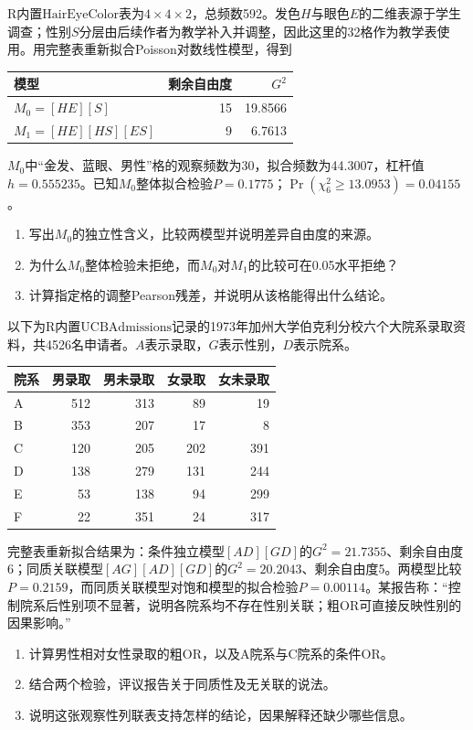 R内置$\mathrm{HairEyeColor}$表为$4\times4\times2$，总频数592。发色$H$与眼色$E$的二维表源于学生调查；性别$S$分层由后续作者为教学补入并调整，因此这里的32格作为教学表使用。用完整表重新拟合Poisson对数线性模型，得到\begin{center}\small\begin{tabular}{@{}lrr@{}}\toprule 模型 & 剩余自由度 & $G^2$\\\midrule $M_0=[HE][S]$ & 15 & 19.8566\\$M_1=[HE][HS][ES]$ & 9 & 6.7613\\\bottomrule\end{tabular}\end{center}$M_0$中“金发、蓝眼、男性”格的观察频数为30，拟合频数为44.3007，杠杆值$h=0.555235$。已知$M_0$整体拟合检验$P=0.1775$；$\Pr(\chi^2_6\ge13.0953)=0.04155$。\begin{enumerate}\item 写出$M_0$的独立性含义，比较两模型并说明差异自由度的来源。\item 为什么$M_0$整体检验未拒绝，而$M_0$对$M_1$的比较可在0.05水平拒绝？\item 计算指定格的调整Pearson残差，并说明从该格能得出什么结论。\end{enumerate}

以下为R内置$\mathrm{UCBAdmissions}$记录的1973年加州大学伯克利分校六个大院系录取资料，共4526名申请者。$A$表示录取，$G$表示性别，$D$表示院系。\begin{center}\small\begin{tabular}{@{}lrrrr@{}}\toprule 院系 & 男录取 & 男未录取 & 女录取 & 女未录取\\\midrule A&512&313&89&19\\B&353&207&17&8\\C&120&205&202&391\\D&138&279&131&244\\E&53&138&94&299\\F&22&351&24&317\\\bottomrule\end{tabular}\end{center}完整表重新拟合结果为：条件独立模型$[AD][GD]$的$G^2=21.7355$、剩余自由度6；同质关联模型$[AG][AD][GD]$的$G^2=20.2043$、剩余自由度5。两模型比较$P=0.2159$，而同质关联模型对饱和模型的拟合检验$P=0.00114$。某报告称：“控制院系后性别项不显著，说明各院系均不存在性别关联；粗OR可直接反映性别的因果影响。”\begin{enumerate}\item 计算男性相对女性录取的粗OR，以及A院系与C院系的条件OR。\item 结合两个检验，评议报告关于同质性及无关联的说法。\item 说明这张观察性列联表支持怎样的结论，因果解释还缺少哪些信息。\end{enumerate}
